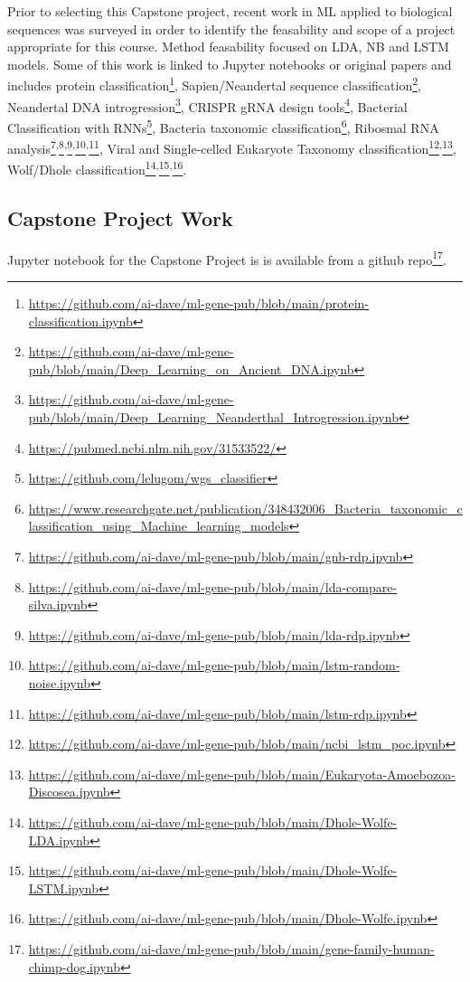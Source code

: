 Prior to selecting this Capstone project, recent work in ML applied to biological sequences was surveyed in order to identify the feasability and scope of a project appropriate for this course.  Method feasability focused on LDA, NB and LSTM models. Some of this work is linked to Jupyter notebooks or original papers and includes protein classification\footnote{\url{https://github.com/ai-dave/ml-gene-pub/blob/main/protein-classification.ipynb}},
Sapien/Neandertal sequence classification\footnote{\url{https://github.com/ai-dave/ml-gene-pub/blob/main/Deep_Learning_on_Ancient_DNA.ipynb}},
Neandertal DNA introgression\footnote{\url{https://github.com/ai-dave/ml-gene-pub/blob/main/Deep_Learning_Neanderthal_Introgression.ipynb}}, 
CRISPR gRNA design tools\footnote{\url{https://pubmed.ncbi.nlm.nih.gov/31533522/}},
Bacterial Classification with RNNs\footnote{\url{https://github.com/lelugom/wgs_classifier}}, 
Bacteria taxonomic classification\footnote{\url{https://www.researchgate.net/publication/348432006_Bacteria_taxonomic_classification_using_Machine_learning_models}},
Ribosmal RNA analysis\footnote{\url{https://github.com/ai-dave/ml-gene-pub/blob/main/gnb-rdp.ipynb}}\textsuperscript{,}\footnote{\url{https://github.com/ai-dave/ml-gene-pub/blob/main/lda-compare-silva.ipynb}}\textsuperscript{,}\footnote{\url{https://github.com/ai-dave/ml-gene-pub/blob/main/lda-rdp.ipynb}}\textsuperscript{,}\footnote{\url{https://github.com/ai-dave/ml-gene-pub/blob/main/lstm-random-noise.ipynb}}\textsuperscript{,}\footnote{\url{https://github.com/ai-dave/ml-gene-pub/blob/main/lstm-rdp.ipynb}},
Viral and Single-celled Eukaryote Taxonomy classification\footnote{\url{https://github.com/ai-dave/ml-gene-pub/blob/main/ncbi_lstm_poc.ipynb}}\textsuperscript{,}\footnote{\url{https://github.com/ai-dave/ml-gene-pub/blob/main/Eukaryota-Amoebozoa-Discosea.ipynb}},
Wolf/Dhole classification\footnote{\url{https://github.com/ai-dave/ml-gene-pub/blob/main/Dhole-Wolfe-LDA.ipynb}}\textsuperscript{,}\footnote{\url{https://github.com/ai-dave/ml-gene-pub/blob/main/Dhole-Wolfe-LSTM.ipynb}}\textsuperscript{,}\footnote{\url{https://github.com/ai-dave/ml-gene-pub/blob/main/Dhole-Wolfe.ipynb}}.

\subsection{Capstone Project Work}
Jupyter notebook for the Capstone Project is is available from a github repo\footnote{\url{https://github.com/ai-dave/ml-gene-pub/blob/main/gene-family-human-chimp-dog.ipynb}}.